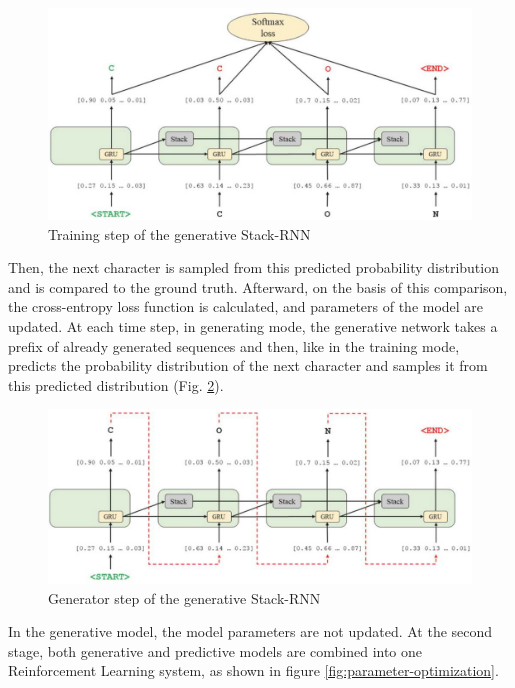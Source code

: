 \documentclass[a4paper]{article}
\begin{document}
\begin{figure}[htbp]
    \centering
        \includegraphics[width=\textwidth]{softmax-loss.png}
    \caption{Training step of the generative Stack-RNN}
    \label{fig:softmax-loss}
\end{figure}
	
Then, the next character is sampled from this predicted probability distribution and is compared to the ground truth. Afterward, on the basis of this comparison, the cross-entropy loss function is calculated, and parameters of the model are updated. 
At each time step, in generating mode, the generative network takes a prefix of already generated sequences and then, like in the training mode, predicts the probability distribution of the next character and samples it from this predicted distribution (Fig. \ref{fig:predicted-distribution}). 

\begin{figure}[htbp]
    \centering
        \includegraphics[width=\textwidth]{predicted-distribution.png}
    \caption{Generator step of the generative Stack-RNN}
    \label{fig:predicted-distribution}
\end{figure}
	
In the generative model, the model parameters are not updated. 
At the second stage, both generative and predictive models are combined into one Reinforcement Learning system, as shown in figure \ref{fig:parameter-optimization}. 
\end{document}

